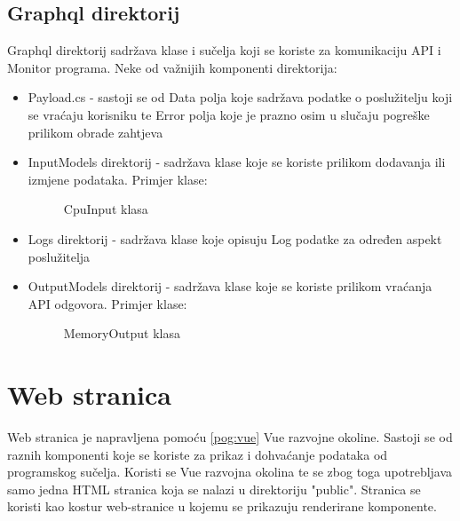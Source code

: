 \documentclass[zavrsnirad]{fer}
\begin{document}
\section{Graphql direktorij}
Graphql direktorij sadržava klase i sučelja koji se koriste za komunikaciju API i Monitor programa.
Neke od važnijih komponenti direktorija:
\begin{itemize}
	\item Payload.cs - sastoji se od Data polja koje sadržava podatke o poslužitelju koji se vraćaju korisniku te Error polja koje je prazno osim u slučaju pogreške prilikom obrade zahtjeva
	\item InputModels direktorij - sadržava klase koje se koriste prilikom dodavanja ili izmjene podataka. Primjer klase:
	\begin{figure}[htb]
		\centering
		
		\caption{CpuInput klasa}
	\end{figure}
	\FloatBarrier
	\item Logs direktorij - sadržava klase koje opisuju Log podatke za određen aspekt poslužitelja
	\item OutputModels direktorij - sadržava klase koje se koriste prilikom vraćanja API odgovora. Primjer klase:
	\begin{figure}[htb]
		\centering
		
		\caption{MemoryOutput klasa}
	\end{figure}
	\FloatBarrier
\end{itemize}

\chapter{Web stranica}
Web stranica je napravljena pomoću \ref{pog:vue} Vue razvojne okoline. Sastoji se od raznih komponenti koje se koriste za prikaz i dohvaćanje podataka od programskog sučelja.
Koristi se Vue razvojna okolina te se zbog toga upotrebljava samo jedna HTML stranica koja se nalazi u direktoriju "public". Stranica se koristi kao kostur web-stranice u kojemu se prikazuju renderirane komponente.
\end{document}
